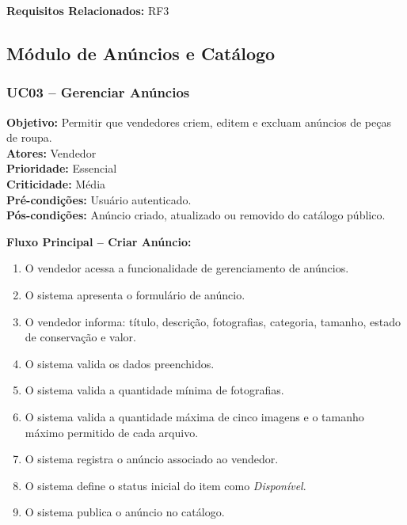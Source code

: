 \documentclass[
	article,			%
	11pt,				%
	oneside,			%
	a4paper,			%
	english,			%
	brazil,				%
	sumario=tradicional
	]{abntex2}
\begin{document}
\vspace{0.5em}
\noindent\textbf{Requisitos Relacionados:} RF3

\subsection{Módulo de Anúncios e Catálogo}

\subsubsection{UC03 – Gerenciar Anúncios}
\label{uc:03}
\noindent\textbf{Objetivo:} Permitir que vendedores criem, editem e excluam anúncios de peças de roupa.\\
\textbf{Atores:} Vendedor\\
\textbf{Prioridade:} Essencial\\
\textbf{Criticidade:} Média\\
\textbf{Pré-condições:} Usuário autenticado.\\
\textbf{Pós-condições:} Anúncio criado, atualizado ou removido do catálogo público.

\vspace{0.5em}
\noindent\textbf{Fluxo Principal – Criar Anúncio:}
\begin{enumerate}[label=\arabic*.]
    \item O vendedor acessa a funcionalidade de gerenciamento de anúncios.
    \item O sistema apresenta o formulário de anúncio.
    \item O vendedor informa: título, descrição, fotografias, categoria, tamanho, estado de conservação e valor.
    \item O sistema valida os dados preenchidos.
    \item O sistema valida a quantidade mínima de fotografias.
    \item O sistema valida a quantidade máxima de cinco imagens e o tamanho máximo permitido de cada arquivo.
    \item O sistema registra o anúncio associado ao vendedor.
    \item O sistema define o status inicial do item como \textit{Disponível}.
    \item O sistema publica o anúncio no catálogo.
\end{enumerate}
\end{document}
